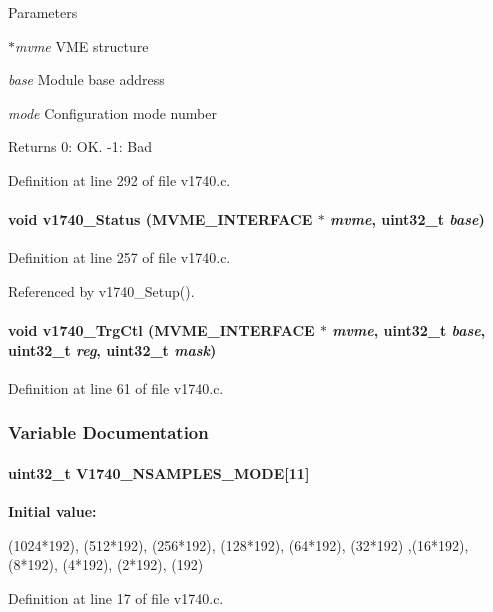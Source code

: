 \begin{DoxyParams}{Parameters}
\item[{\em $\ast$mvme}]VME structure \item[{\em base}]Module base address \item[{\em mode}]Configuration mode number \end{DoxyParams}
\begin{DoxyReturn}{Returns}
0: OK. -\/1: Bad 
\end{DoxyReturn}


Definition at line 292 of file v1740.c.
\paragraph[{v1740\_\-Status}]{\setlength{\rightskip}{0pt plus 5cm}void v1740\_\-Status ({\bf MVME\_\-INTERFACE} $\ast$ {\em mvme}, \/  uint32\_\-t {\em base})}\hfill\label{v1740_8c_a63433b3b12494b29e5c56ea9dfc1642b}


Definition at line 257 of file v1740.c.

Referenced by v1740\_\-Setup().
\paragraph[{v1740\_\-TrgCtl}]{\setlength{\rightskip}{0pt plus 5cm}void v1740\_\-TrgCtl ({\bf MVME\_\-INTERFACE} $\ast$ {\em mvme}, \/  uint32\_\-t {\em base}, \/  uint32\_\-t {\em reg}, \/  uint32\_\-t {\em mask})}\hfill\label{v1740_8c_acb51bdaa8ecfb75b3f49cf1f084fc8e8}


Definition at line 61 of file v1740.c.

\subsubsection{Variable Documentation}
\paragraph[{V1740\_\-NSAMPLES\_\-MODE}]{\setlength{\rightskip}{0pt plus 5cm}uint32\_\-t {\bf V1740\_\-NSAMPLES\_\-MODE}\mbox{[}11\mbox{]}}\hfill\label{v1740_8c_a78b75f453b30a36664143259097a05cd}
{\bfseries Initial value:}
\begin{DoxyCode}
 { (1024*192), (512*192), (256*192), (128*192), (64*192), (32*192)
                               ,(16*192), (8*192), (4*192), (2*192), (192)}
\end{DoxyCode}


Definition at line 17 of file v1740.c.